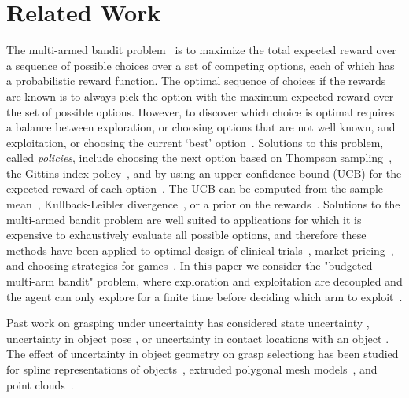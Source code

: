 \documentclass[letterpaper, 10 pt, conference]{ieeeconf}  %
\begin{document}
\section{Related Work}

The multi-armed bandit problem~\cite{barto1998reinforcement, lai1985asymptotically, robbins1985some} is to maximize the total expected reward over a sequence of possible choices over a set of competing options, each of which has a probabilistic reward function.
The optimal sequence of choices if the rewards are known is to always pick the option with the maximum expected reward over the set of possible options.
However, to discover which choice is optimal requires a balance between exploration, or choosing options that are not well known, and exploitation, or choosing the current `best' option~\cite{barto1998reinforcement}.
Solutions to this problem, called {\it policies}, include choosing the next option based on Thompson sampling~\cite{agrawal2011analysis}, the Gittins index policy~\cite{weber1992gittins}, and by using an upper confidence bound (UCB) for the expected reward of each option~\cite{auer2002finite}.
The UCB can be computed from the sample mean~\cite{agrawal1995sample}, Kullback-Leibler divergence~\cite{cappe2013kullback}, or a prior on the rewards~\cite{kaufmann2012bayesian}.
Solutions to the multi-armed bandit problem are well suited to applications for which it is expensive to exhaustively evaluate all possible options, and therefore these methods have been applied to optimal design of clinical trials~\cite{simon1989optimal}, market pricing~\cite{rothschild1974two}, and choosing strategies for games~\cite{st2012online}.
In this paper we consider the "budgeted multi-arm bandit" problem, where exploration and exploitation are decoupled and the agent can only explore for a finite time before deciding which arm to exploit~\cite{madani2004budgeted}.

Past work on grasping under uncertainty has considered state uncertainty \cite{goldberg1990bayesian, stulp2011learning},  uncertainty in object pose \cite{christopoulos2007handling, weisz2012pose, kim2012physically}, or uncertainty in contact locations with an object \cite{zheng2005}.
The effect of uncertainty in object geometry on grasp selectiong has been studied for spline representations of objects~\cite{christopoulos2007handling}, extruded polygonal mesh models~\cite{kehoe2012estimating, kehoe2012toward}, and point clouds~\cite{hsiao2011bayesian}.
\end{document}
